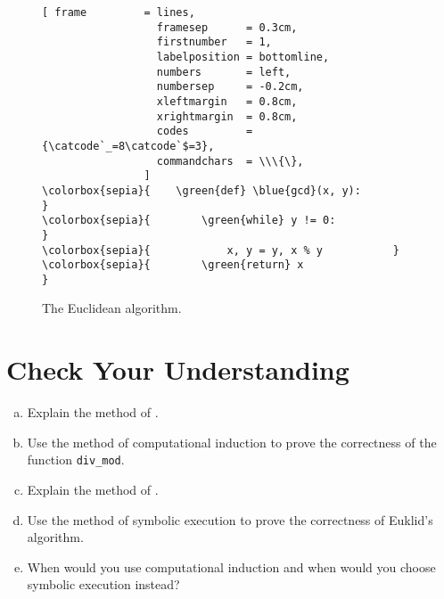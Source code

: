 \begin{figure}[!ht]
\centering
\begin{Verbatim}[ frame         = lines, 
                  framesep      = 0.3cm, 
                  firstnumber   = 1,
                  labelposition = bottomline,
                  numbers       = left,
                  numbersep     = -0.2cm,
                  xleftmargin   = 0.8cm,
                  xrightmargin  = 0.8cm,
                  codes         = {\catcode`_=8\catcode`$=3},
                  commandchars  = \\\{\},
                ]
\colorbox{sepia}{    \green{def} \blue{gcd}(x, y):                    }
\colorbox{sepia}{        \green{while} y != 0:                 }
\colorbox{sepia}{            x, y = y, x % y           }
\colorbox{sepia}{        \green{return} x                      }
\end{Verbatim}
\vspace*{-0.3cm}
\caption{The Euclidean algorithm.}
\label{fig:gcd.stlx}
\end{figure}

\section{Check Your Understanding}
\begin{enumerate}[(a)]
\item Explain the method of .
\item Use the method of computational induction to prove the correctness of the function \texttt{div\_mod}.
\item Explain the method of .
\item Use the method of symbolic execution to prove the correctness of Euklid's algorithm.
\item When would you use computational induction and when would you choose symbolic execution instead?
\end{enumerate}

